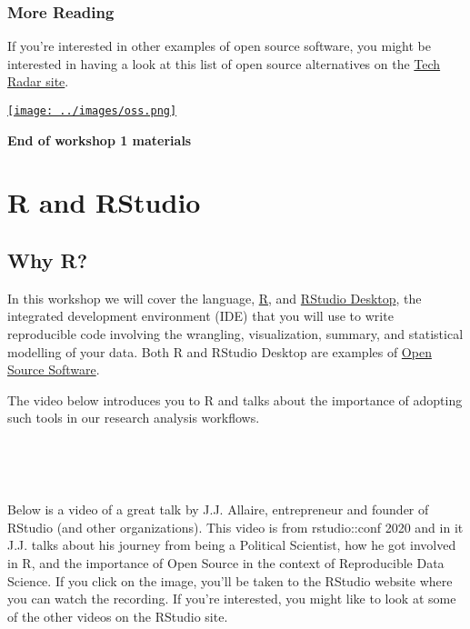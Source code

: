 \documentclass[
]{book}
\begin{document}
\hypertarget{more-reading}{%
\subsection{More Reading}\label{more-reading}}

If you're interested in other examples of open source software, you might be interested in having a look at this list of open source alternatives on the \href{https://www.techradar.com/uk/best/best-open-source-software}{Tech Radar site}.

\href{https://www.techradar.com/uk/best/best-open-source-software}{\texttt{[image: ../images/oss.png]}}

\textbf{End of workshop 1 materials}

\hypertarget{r-and-rstudio}{%
\chapter{R and RStudio}\label{r-and-rstudio}}

\hypertarget{why-r}{%
\section{Why R?}\label{why-r}}

In this workshop we will cover the language, \href{https://www.r-project.org/about.html}{R}, and \href{https://posit.co/products/open-source/rstudio}{RStudio Desktop}, the integrated development environment (IDE) that you will use to write reproducible code involving the wrangling, visualization, summary, and statistical modelling of your data. Both R and RStudio Desktop are examples of \href{https://opensource.com/resources/what-open-source}{Open Source Software}.

The video below introduces you to R and talks about the importance of adopting such tools in our research analysis workflows.

~~

~~

Below is a video of a great talk by J.J. Allaire, entrepreneur and founder of RStudio (and other organizations). This video is from rstudio::conf 2020 and in it J.J. talks about his journey from being a Political Scientist, how he got involved in R, and the importance of Open Source in the context of Reproducible Data Science. If you click on the image, you'll be taken to the RStudio website where you can watch the recording. If you're interested, you might like to look at some of the other videos on the RStudio site.
\end{document}
